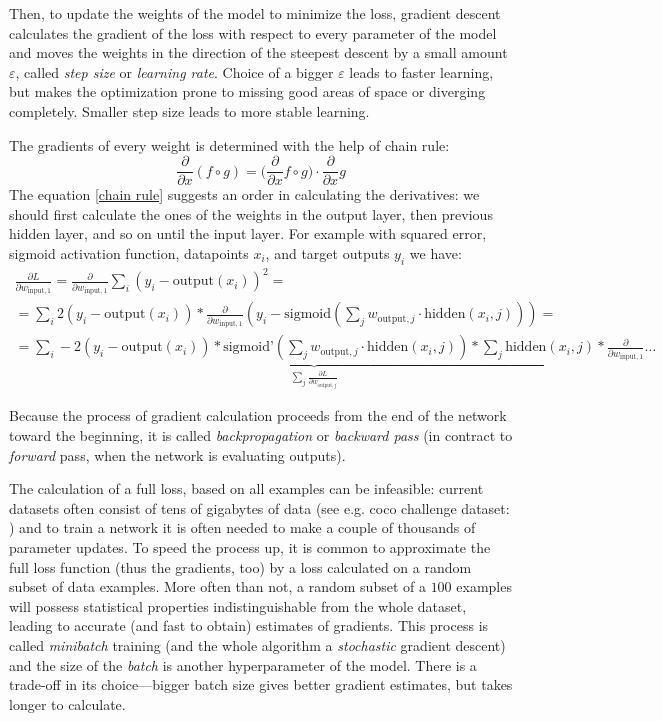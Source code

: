 Then, to update the weights of the model to minimize the loss, gradient descent calculates the gradient of the loss with respect to every parameter of the model and moves the weights in the direction of the steepest descent by a small amount $\varepsilon$, called \emph{step size} or \emph{learning rate}. Choice of a bigger $\varepsilon$ leads to faster learning, but makes the optimization prone to missing good areas of space or diverging completely. Smaller step size leads to more stable
learning.

The gradients of every weight is determined with the help of chain rule:
\begin{equation}\label{chain rule}
  \frac{\partial}{\partial x} (f \circ g) = (\frac{\partial}{\partial x} f \circ g\big) \cdot \frac{\partial}{\partial x}g
\end{equation}
The equation \eqref{chain rule} suggests an order in calculating the derivatives: we should first calculate the ones of the weights in the output layer, then previous hidden layer, and so on until the input layer. For example with squared error, sigmoid activation function, datapoints $x_i$, and target outputs $y_i$ we have:
\begin{multline}
  \frac{\partial L}{\partial w_{\text{input}, 1}} = \frac{\partial}{\partial w_{\text{input}, 1}} \sum_{i} (y_i - \text{output}(x_i))^2 =\\=  \sum_{i} 2(y_i - \text{output}(x_i)) * \frac{\partial}{\partial w_{\text{input}, 1}}
  ( y_i - \text{sigmoid}(\sum_j w_{\text{output}, j} \cdot \text{hidden}(x_i, j))) =\\=
  \underbrace{\sum_{i} -2(y_i - \text{output}(x_i)) * \text{sigmoid'}(\sum_j w_{\text{output}, j} \cdot \text{hidden}(x_i, j)) * \sum_j \text{hidden}(x_i, j)}_{\sum_j \frac{\partial L}{\partial w_{\text{output}, j}}} * \frac{\partial}{\partial w_{\text{input}, 1}}\ldots
\end{multline}

Because the process of gradient calculation proceeds from the end of the network toward the beginning, it is called \emph{backpropagation} or \emph{backward pass} (in contract to \emph{forward} pass, when the network is evaluating outputs).

The calculation of a full loss, based on all examples can be infeasible: current datasets often consist of tens of gigabytes of data (see e.g. coco challenge dataset: \cite{coco-dataset}) and to train a network it is often needed to make a couple of thousands of parameter updates.
To speed the process up, it is common to approximate the full loss function (thus the gradients, too) by a loss calculated on a random subset of data examples. More often than not, a random subset of a $100$ examples will possess statistical properties indistinguishable from the whole dataset, leading to accurate (and fast to obtain) estimates of gradients. This process is called \emph{minibatch} training (and the whole algorithm a \emph{stochastic} gradient descent) and the size of the \emph{batch} is another hyperparameter of the model. There is a trade-off in its choice---bigger batch size gives better gradient estimates, but takes longer to calculate.

